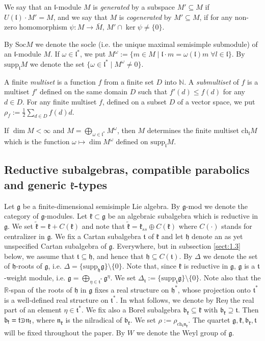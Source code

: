 \documentclass[10pt]{amsart}
\newcommand{\supp}{\mathrm{supp}}
\newcommand{\ch}{\mathrm{ch}}
\newcommand{\Soc}{\mathrm{Soc}}
\newcommand{\field}[1]{\mathbb{#1}}
\newcommand{\bb}{\mathfrak{b}}
\renewcommand{\gg}{\mathfrak{g}}
\newcommand{\hh}{\mathfrak{h}}
\newcommand{\kk}{\mathfrak{k}}
\renewcommand{\ll}{\mathfrak{l}}
\newcommand{\nn}{\mathfrak{n}}
\renewcommand{\tt}{\mathfrak{t}}
\def\crplus{\hbox{$\supset${\raise1.05pt\hbox{\kern -0.55em ${\scriptscriptstyle +}$}}\ }}
\begin{document}
We say that an $\ll$-module $M$ is \textit{generated} by a subspace $M'\subseteq M$ if $U(\ll)\cdot M'=M$, and we say that $M$ is \textit{cogenerated} by $M'\subseteq M$, if for any non-zero homomorphism $\psi :M\rightarrow\bar{M}$, $M'\cap\ker\psi\neq\{0\}$. 

By $\Soc M$ we denote the socle (i.e. the unique maximal semisimple submodule) of an $\ll$-module $M$. If $\omega\in\ll^*$, we put $M^\omega:=\{m\in M\; |\; \ll\cdot m=\omega(\ll)m \;\forall l \in\ll\}$. By $\supp_\ll M$ we denote the set $\{\omega\in\ll^*\; |\; M^\omega\neq 0\}$.

A finite \textit{multiset} is a function $f$ from a finite set $D$ into $\field{N}$. A \textit{submultiset} of $f$ is a multiset $f'$ defined on the same domain $D$ such that $f'(d)\leq f(d)$ for any $d\in D$. For any finite multiset $f$, defined on a subset $D$ of a vector space, we put $\rho_f:=\frac{1}{2}\sum_{d\in D}f(d)d$.

If $\dim M<\infty$ and $M=\bigoplus_{\omega\in\ll^*}M^\omega$, then $M$ determines the finite multiset $\ch_{\ll}M$ which is the function $\omega\mapsto\dim M^\omega$ defined on $\supp_{\ll}M$.

\subsection{Reductive subalgebras, compatible parabolics and generic $\kk$-types}\label{sect:1.2}

Let $\gg$ be a finite-dimensional semisimple Lie algebra. By $\gg$-mod we denote the category of $\gg$-modules. Let $\kk\subset\gg$ be an algebraic subalgebra which is reductive in $\gg$. We set $\tilde{\kk} = \kk + C(\kk)$ and note that $\tilde{\kk}=\kk_{ss} \oplus C(\kk)$ where $C(\cdot)$ stands for centralizer in $\gg$. We fix a Cartan subalgebra $\tt$ of $\kk$ and let $\hh$ denote an as yet unspecified Cartan subalgebra of $\gg$. Everywhere, but in subsection \ref{sect:1.3} below, we assume that $\tt \subseteq \hh$, and hence that $\hh \subseteq C(\tt)$. By $\Delta$ we denote the set of $\hh$-roots of $\gg$, i.e. $\Delta=\{\supp_\hh\gg\}\setminus\{0\}$. Note that, since $\kk$ is reductive in $\gg$, $\gg$ is a $\tt$-weight module, i.e. $\gg=\bigoplus_{\eta\in\tt^*}\gg^\eta$. We set $\Delta_\tt:=\{\supp_\tt\gg\}\setminus\{0\}$. Note also that the $\field{R}$-span of the roots of $\hh$ in $\gg$ fixes a real structure on $\hh^*$, whose projection onto $\tt^*$ is a well-defined real structure on $\tt^*$. In 
what follows, 
we 
denote by $\mathrm{Re}\eta$ the real part of an 
element $\eta\in\tt^*$. We fix also a Borel subalgebra $\bb_\kk\subseteq\kk$ with $\bb_\kk\supseteq\tt$. Then $\bb_\kk=\tt\crplus\nn_\kk$, where $\nn_\kk$ is the nilradical of $\bb_\kk$. We set $\rho:=\rho_{\ch_\tt\nn_\kk}$. The quartet $\gg,\kk,\bb_\kk,\tt$ will be fixed throughout the paper. By $W$ we denote the Weyl group of $\gg$.
\end{document}

